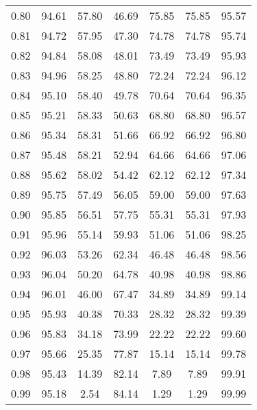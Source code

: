 \begin{tabular}{|c|c|c|c|c|c|c|}
      0.80 &     94.61 &     57.80 &      46.69 &   75.85 &      75.85 &         95.57 \\
      0.81 &     94.72 &     57.95 &      47.30 &   74.78 &      74.78 &         95.74 \\
      0.82 &     94.84 &     58.08 &      48.01 &   73.49 &      73.49 &         95.93 \\
      0.83 &     94.96 &     58.25 &      48.80 &   72.24 &      72.24 &         96.12 \\
      0.84 &     95.10 &     58.40 &      49.78 &   70.64 &      70.64 &         96.35 \\
      0.85 &     95.21 &     58.33 &      50.63 &   68.80 &      68.80 &         96.57 \\
      0.86 &     95.34 &     58.31 &      51.66 &   66.92 &      66.92 &         96.80 \\
      0.87 &     95.48 &     58.21 &      52.94 &   64.66 &      64.66 &         97.06 \\
      0.88 &     95.62 &     58.02 &      54.42 &   62.12 &      62.12 &         97.34 \\
      0.89 &     95.75 &     57.49 &      56.05 &   59.00 &      59.00 &         97.63 \\
      0.90 &     95.85 &     56.51 &      57.75 &   55.31 &      55.31 &         97.93 \\
      0.91 &     95.96 &     55.14 &      59.93 &   51.06 &      51.06 &         98.25 \\
      0.92 &     96.03 &     53.26 &      62.34 &   46.48 &      46.48 &         98.56 \\
      0.93 &     96.04 &     50.20 &      64.78 &   40.98 &      40.98 &         98.86 \\
      0.94 &     96.01 &     46.00 &      67.47 &   34.89 &      34.89 &         99.14 \\
      0.95 &     95.93 &     40.38 &      70.33 &   28.32 &      28.32 &         99.39 \\
      0.96 &     95.83 &     34.18 &      73.99 &   22.22 &      22.22 &         99.60 \\
      0.97 &     95.66 &     25.35 &      77.87 &   15.14 &      15.14 &         99.78 \\
      0.98 &     95.43 &     14.39 &      82.14 &    7.89 &       7.89 &         99.91 \\
      0.99 &     95.18 &      2.54 &      84.14 &    1.29 &       1.29 &         99.99 \\
\bottomrule
\end{tabular}
